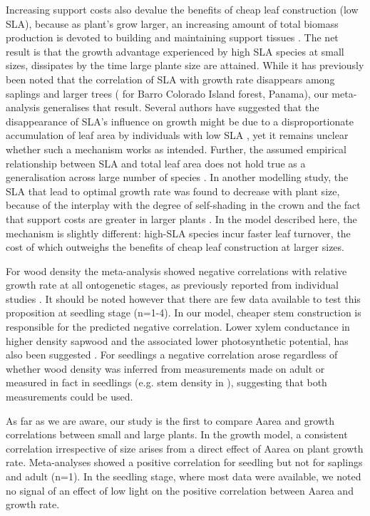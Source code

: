 \documentclass[a4paper,11pt]{article}
\begin{document}
Increasing support costs also devalue the benefits of cheap leaf construction (low SLA), because as plant's grow larger, an increasing amount of total biomass production is devoted to building and maintaining support tissues \citep{Givnish:1995ta,King-2011}. The net result is that the growth advantage experienced by high SLA species at small sizes, dissipates by the time large plante size are attained. While it has previously been noted that the correlation of SLA with growth rate disappears among saplings and larger trees (\citealt{Wright:2010tp} for Barro Colorado Island forest, Panama), our meta-analysis generalises that result. Several authors have suggested that the disappearance of SLA's influence on growth might be due to a disproportionate accumulation of leaf area by individuals with low SLA \citep{Reich:1992wm, Poorter:2008iu,Wright:2010tp}, yet it remains unclear whether such a mechanism works as intended. Further, the assumed empirical relationship between SLA and total leaf area does not hold true as a generalisation across large number of species \citep{Duursma-2015}. In another modelling study, the SLA that lead to optimal growth rate was found to decrease with plant size, because of the interplay with the degree of self-shading in the crown and the fact that support costs are greater in larger plants \citep{King-1999}. In the model described here, the mechanism is slightly different: high-SLA species incur faster leaf turnover, the cost of which outweighs the benefits of cheap leaf construction at larger sizes.

For wood density the meta-analysis showed negative correlations with relative growth rate at all ontogenetic stages, as previously reported from individual studies \citep{Wright:2010tp,Ruger:2012jv}. It should be noted however that there are few data available to test this proposition at seedling stage (n=1-4). In our model, cheaper stem construction is responsible for the predicted negative correlation. Lower xylem conductance in higher density sapwood and the associated lower photosynthetic potential, has also been suggested \citep[reviewed by][]{Chave:2009iy}.
For seedlings a negative correlation arose regardless of whether wood density was inferred from measurements made on adult or measured in fact in seedlings (e.g. stem density in  \citealt{CastroDiez:1998gz}), suggesting that both measurements could be used.

As far as we are aware, our study is the first to compare Aarea and growth correlations between small and large plants. In the growth model, a consistent correlation irrespective of size arises from a direct effect of Aarea on plant growth rate. Meta-analyses showed a positive correlation for seedling but not for saplings and adult (n=1). In the seedling stage, where most data were available, we noted no signal of an effect of low light on the positive correlation between Aarea and growth rate.
\end{document}
